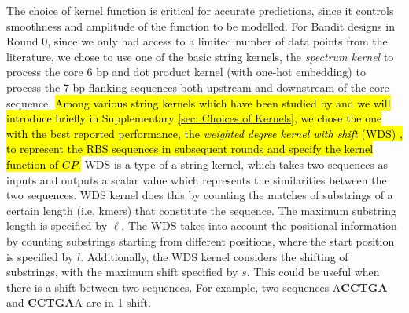 \documentclass{scrartcl}[2013/05/29]%
\begin{document}
The choice of kernel function is critical for accurate predictions, since it controls smoothness and amplitude of the function to be modelled.
For Bandit designs in Round 0, since we only had access to a limited number of data points from the literature, we chose to use one of the basic string kernels, the \textit{spectrum kernel} \cite{leslie2001spectrum} to process the core 6 bp and dot product kernel \cite{Rasmussen2004} (with one-hot embedding) to process the 7 bp flanking sequences both upstream and downstream of the core sequence.
\hl{
Among various string kernels which have been studied by \mbox{\textcite{Ben-Hur2008}} and we will introduce briefly in Supplementary \mbox{\ref{sec: Choices of Kernels}}, we chose the one with the best reported performance, the \textit{weighted degree kernel with shift} (WDS) \mbox{\cite{ratsch_rase_2005_wds, Ben-Hur2008}},  
to represent the RBS sequences in subsequent rounds and specify the kernel function of $GP$.  }
WDS is a type of a string kernel, which takes two sequences as inputs and outputs a scalar value which represents the similarities between the two sequences.  
WDS kernel does this by counting the matches of substrings of a certain length (i.e. kmers) that constitute the sequence.
The maximum substring length is specified by $\ell$.
The WDS takes into account the positional information by counting substrings starting from different positions, where the start position is specified by $l$.
Additionally, the WDS kernel considers the shifting of substrings, with the maximum shift specified by $s$.
This could be useful when there is a shift between two sequences.
For example, two sequences A\textbf{CCTGA} and \textbf{CCTGA}A are in 1-shift. \\
\end{document}
